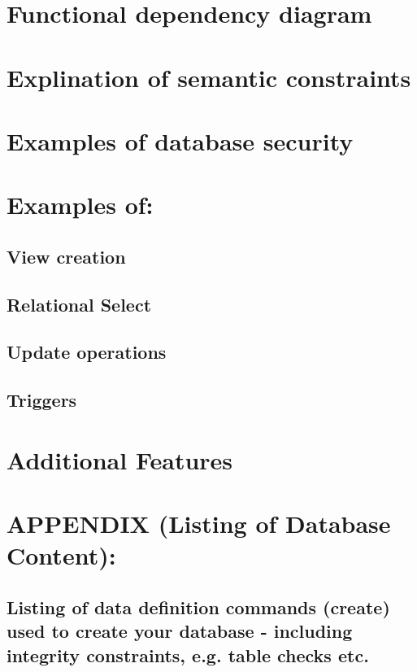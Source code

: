 \documentclass{article}
\begin{document}
\section{Functional dependency diagram}

\section{Explination of semantic constraints}

\section{Examples of database security}

\section{Examples of:}
\subsection{View creation}
\subsection{Relational Select}
\subsection{Update operations}
\subsection{Triggers}
\section{Additional Features}
\section{APPENDIX (Listing of Database Content):}
\subsection{Listing of data definition commands (create) used to create your database - including integrity constraints, e.g. table checks etc.}
\end{document}
